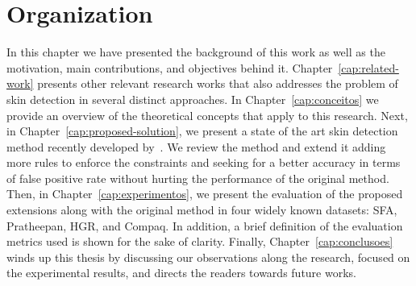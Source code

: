 \section{Organization}
\label{sec:text_organization}
In this chapter we have presented the background of this work as well as the motivation, main contributions, and objectives behind it. Chapter~\ref{cap:related-work} presents other relevant research works that also addresses the problem of skin detection in several distinct  approaches. In Chapter~\ref{cap:conceitos} we provide an overview of the theoretical concepts that apply to this research. Next, in Chapter~\ref{cap:proposed-solution}, we present a state of the art skin detection method recently developed by~\citet{brancati:17}. We review the method and extend it adding more rules to enforce the constraints and seeking for a better accuracy in terms of false positive rate without hurting the performance of the original method. Then, in Chapter~\ref{cap:experimentos}, we present the evaluation of the proposed extensions along with the original method in four widely known datasets: SFA, Pratheepan, HGR, and Compaq. In addition, a
brief definition of the evaluation metrics used is shown for the sake of clarity. Finally, Chapter~\ref{cap:conclusoes} winds up this thesis by discussing our observations along the research, focused on the experimental results, and directs the readers towards future works.